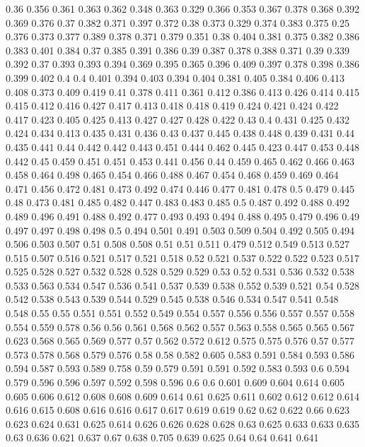 0.36 0.356
0.361 0.363
0.362 0.348
0.363 0.329
0.366 0.353
0.367 0.378
0.368 0.392
0.369 0.376
0.37 0.382
0.371 0.397
0.372 0.38
0.373 0.329
0.374 0.383
0.375 0.25
0.376 0.373
0.377 0.389
0.378 0.371
0.379 0.351
0.38 0.404
0.381 0.375
0.382 0.386
0.383 0.401
0.384 0.37
0.385 0.391
0.386 0.39
0.387 0.378
0.388 0.371
0.39 0.339
0.392 0.37
0.393 0.393
0.394 0.369
0.395 0.365
0.396 0.409
0.397 0.378
0.398 0.386
0.399 0.402
0.4 0.4
0.401 0.394
0.403 0.394
0.404 0.381
0.405 0.384
0.406 0.413
0.408 0.373
0.409 0.419
0.41 0.378
0.411 0.361
0.412 0.386
0.413 0.426
0.414 0.415
0.415 0.412
0.416 0.427
0.417 0.413
0.418 0.418
0.419 0.424
0.421 0.424
0.422 0.417
0.423 0.405
0.425 0.413
0.427 0.427
0.428 0.422
0.43 0.4
0.431 0.425
0.432 0.424
0.434 0.413
0.435 0.431
0.436 0.43
0.437 0.445
0.438 0.448
0.439 0.431
0.44 0.435
0.441 0.44
0.442 0.442
0.443 0.451
0.444 0.462
0.445 0.423
0.447 0.453
0.448 0.442
0.45 0.459
0.451 0.451
0.453 0.441
0.456 0.44
0.459 0.465
0.462 0.466
0.463 0.458
0.464 0.498
0.465 0.454
0.466 0.488
0.467 0.454
0.468 0.459
0.469 0.464
0.471 0.456
0.472 0.481
0.473 0.492
0.474 0.446
0.477 0.481
0.478 0.5
0.479 0.445
0.48 0.473
0.481 0.485
0.482 0.447
0.483 0.483
0.485 0.5
0.487 0.492
0.488 0.492
0.489 0.496
0.491 0.488
0.492 0.477
0.493 0.493
0.494 0.488
0.495 0.479
0.496 0.49
0.497 0.497
0.498 0.498
0.5 0.494
0.501 0.491
0.503 0.509
0.504 0.492
0.505 0.494
0.506 0.503
0.507 0.51
0.508 0.508
0.51 0.51
0.511 0.479
0.512 0.549
0.513 0.527
0.515 0.507
0.516 0.521
0.517 0.521
0.518 0.52
0.521 0.537
0.522 0.522
0.523 0.517
0.525 0.528
0.527 0.532
0.528 0.528
0.529 0.529
0.53 0.52
0.531 0.536
0.532 0.538
0.533 0.563
0.534 0.547
0.536 0.541
0.537 0.539
0.538 0.552
0.539 0.521
0.54 0.528
0.542 0.538
0.543 0.539
0.544 0.529
0.545 0.538
0.546 0.534
0.547 0.541
0.548 0.548
0.55 0.55
0.551 0.551
0.552 0.549
0.554 0.557
0.556 0.556
0.557 0.557
0.558 0.554
0.559 0.578
0.56 0.56
0.561 0.568
0.562 0.557
0.563 0.558
0.565 0.565
0.567 0.623
0.568 0.565
0.569 0.577
0.57 0.562
0.572 0.612
0.575 0.575
0.576 0.57
0.577 0.573
0.578 0.568
0.579 0.576
0.58 0.58
0.582 0.605
0.583 0.591
0.584 0.593
0.586 0.594
0.587 0.593
0.589 0.758
0.59 0.579
0.591 0.591
0.592 0.583
0.593 0.6
0.594 0.579
0.596 0.596
0.597 0.592
0.598 0.596
0.6 0.6
0.601 0.609
0.604 0.614
0.605 0.605
0.606 0.612
0.608 0.608
0.609 0.614
0.61 0.625
0.611 0.602
0.612 0.612
0.614 0.616
0.615 0.608
0.616 0.616
0.617 0.617
0.619 0.619
0.62 0.62
0.622 0.66
0.623 0.623
0.624 0.631
0.625 0.614
0.626 0.626
0.628 0.628
0.63 0.625
0.633 0.633
0.635 0.63
0.636 0.621
0.637 0.67
0.638 0.705
0.639 0.625
0.64 0.64
0.641 0.641
